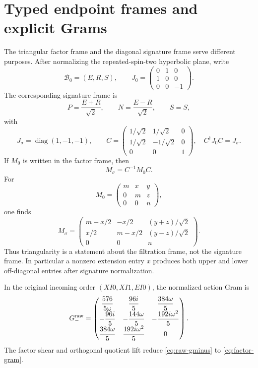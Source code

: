 \documentclass[11pt]{article}
\theoremstyle{definition}
\theoremstyle{remark}
\begin{document}
\appendix

\section{Typed endpoint frames and explicit Grams}
\label{app:typed-grams}

The triangular factor frame and the diagonal signature frame serve different
purposes.  After normalizing the repeated-spin-two hyperbolic plane, write
\[
\mathcal B_0=(E,R,S),\qquad
J_0=
\begin{pmatrix}
0&1&0\\
1&0&0\\
0&0&-1
\end{pmatrix}.
\]
The corresponding signature frame is
\[
P=\frac{E+R}{\sqrt2},\qquad
N=\frac{E-R}{\sqrt2},\qquad
S=S,
\]
with
\[
J_\sigma=\operatorname{diag}(1,-1,-1),\qquad
C=
\begin{pmatrix}
1/\sqrt2&1/\sqrt2&0\\
1/\sqrt2&-1/\sqrt2&0\\
0&0&1
\end{pmatrix},
\quad C^\dagger J_0C=J_\sigma.
\]
If \(M_0\) is written in the factor frame, then
\[
M_\sigma=C^{-1}M_0C.
\]
For
\[
M_0=
\begin{pmatrix}
m&x&y\\0&m&z\\0&0&n
\end{pmatrix},
\]
one finds
\[
M_\sigma=
\begin{pmatrix}
m+x/2&-x/2&(y+z)/\sqrt2\\
x/2&m-x/2&(y-z)/\sqrt2\\
0&0&n
\end{pmatrix}.
\]
Thus triangularity is a statement about the filtration frame, not the
signature frame.  In particular a nonzero extension entry \(x\) produces
both upper and lower off-diagonal entries after signature normalization.

In the original incoming order
\((XI0,XI1,EI0)\), the normalized action Gram is
\begin{equation}
\label{eq:raw-gminus}
G_-^{\rm raw}=
\begin{pmatrix}
\dfrac{576}{5\omega}&\dfrac{96i}{5}&\dfrac{384\omega}{5}\\
-\dfrac{96i}{5}&-\dfrac{144\omega}{5}&-\dfrac{192i\omega^2}{5}\\
\dfrac{384\omega}{5}&\dfrac{192i\omega^2}{5}&0
\end{pmatrix}.
\end{equation}
The factor shear and orthogonal quotient lift reduce
\eqref{eq:raw-gminus} to \eqref{eq:factor-gram}.
\end{document}
